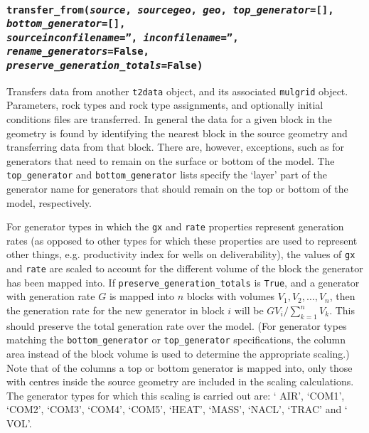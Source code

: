 \begin{snugshade}
\subsubsection{\texttt{transfer\_from(\emph{source}, \emph{sourcegeo}, \emph{geo}, \emph{top\_generator}=[], \emph{bottom\_generator}=[],\\
    \emph{sourceinconfilename}='', \emph{inconfilename}='', \emph{rename\_generators}=False, \\
    \emph{preserve\_generation\_totals}=False)}}
\end{snugshade}
\label{sec:t2data:transfer_from}

Transfers data from another \texttt{t2data} object, and its associated \texttt{mulgrid} object.  Parameters, rock types and rock type assignments, and optionally initial conditions files are transferred.  In general the data for a given block in the geometry is found by identifying the nearest block in the source geometry and transferring data from that block.  There are, however, exceptions, such as for generators that need to remain on the surface or bottom of the model.  The \texttt{top\_generator} and \texttt{bottom\_generator} lists specify the `layer' part of the generator name for generators that should remain on the top or bottom of the model, respectively.

For generator types in which the \texttt{gx} and \texttt{rate} properties represent generation rates (as opposed to other types for which these properties are used to represent other things, e.g. productivity index for wells on deliverability), the values of \texttt{gx} and \texttt{rate} are scaled to account for the different volume of the block the generator has been mapped into.  If \texttt{preserve\_generation\_totals} is \texttt{True}, and a generator with generation rate $G$ is mapped into $n$ blocks with volumes $V_1, V_2,\ldots, V_n$, then the generation rate for the new generator in block $i$ will be $G V_i/\sum_{k=1}^{n}{V_k}$.  This should preserve the total generation rate over the model.  (For generator types matching the \texttt{bottom\_generator} or \texttt{top\_generator} specifications, the column area instead of the block volume is used to determine the appropriate scaling.)  Note that of the columns a top or bottom generator is mapped into, only those with centres inside the source geometry are included in the scaling calculations.  The generator types for which this scaling is carried out are: ` AIR', `COM1', `COM2', `COM3', `COM4', `COM5', `HEAT', `MASS', `NACL', `TRAC'  and ` VOL'.

